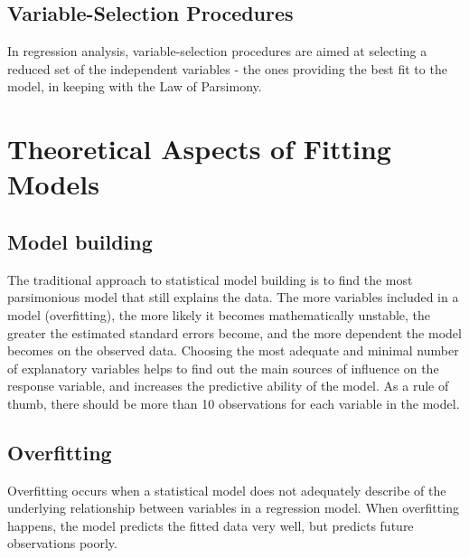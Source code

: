 \documentclass[a4paper,12pt]{article}
\begin{document}
\subsection{Variable-Selection Procedures}

In regression analysis, variable-selection procedures are aimed at selecting a reduced set of the independent variables - the ones providing the best fit to the model, in keeping with the Law of Parsimony.






\section{Theoretical Aspects of Fitting Models}



\subsection{Model building}

The traditional approach to statistical model building is to find the most parsimonious model that still explains the data. The more variables included in a model (overfitting), the more likely it becomes mathematically unstable, the greater the estimated standard errors become, and the more dependent the model becomes on the observed data. Choosing the most adequate and minimal number of explanatory variables helps to find out the main sources of influence on the response variable, and increases the predictive ability of the model. As a rule of thumb, there should be more than 10 observations for each variable in the model.
%


\subsection{Overfitting}

Overfitting occurs when a statistical model does not adequately describe of the underlying relationship between variables in a regression model. When overfitting happens, the model predicts the fitted data very well, but predicts future observations poorly.
\end{document}
